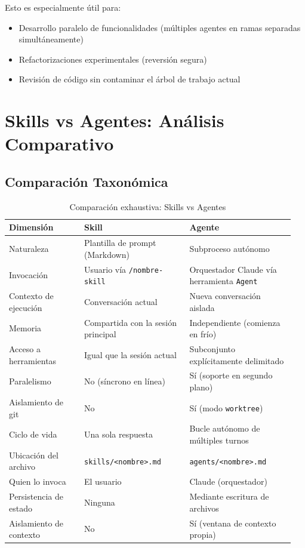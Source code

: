 \documentclass[11pt,letterpaper]{article}
\begin{document}
Esto es especialmente útil para:
\begin{itemize}[leftmargin=*]
    \item Desarrollo paralelo de funcionalidades (múltiples agentes en ramas separadas simultáneamente)
    \item Refactorizaciones experimentales (reversión segura)
    \item Revisión de código sin contaminar el árbol de trabajo actual
\end{itemize}

\section{Skills vs Agentes: Análisis Comparativo}

\subsection{Comparación Taxonómica}

\begin{table}[H]
\centering
\caption{Comparación exhaustiva: Skills vs Agentes}
\begin{tabular}{@{}p{0.25\linewidth}p{0.35\linewidth}p{0.35\linewidth}@{}}
\toprule
\textbf{Dimensión} & \textbf{Skill} & \textbf{Agente} \\
\midrule
Naturaleza & Plantilla de prompt (Markdown) & Subproceso autónomo \\
Invocación & Usuario vía \texttt{/nombre-skill} & Orquestador Claude vía herramienta \texttt{Agent} \\
Contexto de ejecución & Conversación actual & Nueva conversación aislada \\
Memoria & Compartida con la sesión principal & Independiente (comienza en frío) \\
Acceso a herramientas & Igual que la sesión actual & Subconjunto explícitamente delimitado \\
Paralelismo & No (síncrono en línea) & Sí (soporte en segundo plano) \\
Aislamiento de git & No & Sí (modo \texttt{worktree}) \\
Ciclo de vida & Una sola respuesta & Bucle autónomo de múltiples turnos \\
Ubicación del archivo & \texttt{skills/<nombre>.md} & \texttt{agents/<nombre>.md} \\
Quien lo invoca & El usuario & Claude (orquestador) \\
Persistencia de estado & Ninguna & Mediante escritura de archivos \\
Aislamiento de contexto & No & Sí (ventana de contexto propia) \\
\bottomrule
\end{tabular}
\end{table}
\end{document}
